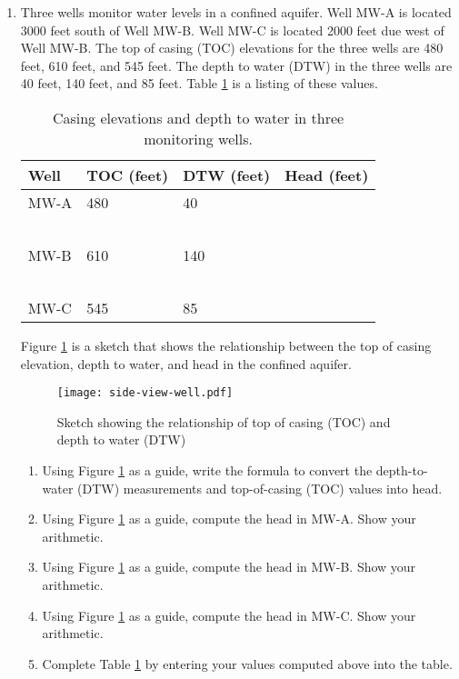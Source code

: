 \documentclass[12pt]{article}
\begin{document}
\begin{enumerate}
\clearpage

\item Three wells monitor water levels in a confined aquifer.  Well MW-A is located 3000 feet south of Well MW-B.   Well MW-C is located 2000 feet due west of Well MW-B.
The top of casing (TOC) elevations for the three wells are 480 feet, 610 feet, and 545 feet.   The depth to water (DTW) in the three wells are 40 feet, 140 feet, and 85 feet.   Table \ref{tab:piezometer-data} is a listing of these values.

\begin{table}[htbp]
   \centering
   \caption{Casing elevations and depth to water in three monitoring wells.}
   \begin{tabular}{p{1in}p{1in}p{1in}p{1in}} %
Well & TOC (feet) & DTW (feet) & Head (feet) \\
\hline
\hline
MW-A & 480 & 40 & ~ \\
~ & ~ & ~ & ~ \\
MW-B & 610 & 140 & ~ \\
~ & ~ & ~ & ~ \\
MW-C & 545 & 85 & ~  \\
\hline
\end{tabular}
\label{tab:piezometer-data}
\end{table}

Figure \ref{fig:side-view-well.pdf} is a sketch that shows the relationship between the top of casing elevation, depth to water, and head in the confined aquifer.

\begin{figure}[h!] %
   \centering
   \texttt{[image: side-view-well.pdf]} 
   \caption{Sketch showing the relationship of top of casing (TOC) and depth to water (DTW)}
   \label{fig:side-view-well.pdf}
\end{figure}

\begin{enumerate}
\item Using Figure \ref{fig:side-view-well.pdf} as a guide, write the formula to convert the depth-to-water (DTW) measurements and top-of-casing (TOC) values into head.
\item Using Figure \ref{fig:side-view-well.pdf} as a guide, compute the head in MW-A.   Show your arithmetic.
\item Using Figure \ref{fig:side-view-well.pdf} as a guide, compute the head in MW-B.   Show your arithmetic.
\item Using Figure \ref{fig:side-view-well.pdf} as a guide, compute the head in MW-C.   Show your arithmetic.
\item Complete Table \ref{tab:piezometer-data} by entering your values computed above into the table.


\end{enumerate}
\end{enumerate}
\end{document}

